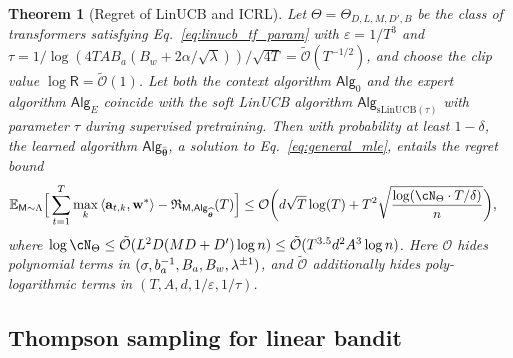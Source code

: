 \documentclass[10pt]{article}
\newtheorem{theorem}{Theorem}
\newcommand{\eps}{\varepsilon}
\renewcommand{\cO}{\mathcal{O}}
\newcommand{\<}{\left\langle}
\renewcommand{\>}{\right\rangle}
\newcommand{\mat}[1]{\ensuremath{\mathbf{#1}}}
\newcommand{\E}{\mathbb{E}}
\newcommand{\B}{\mat{B}}
\newcommand{\inst}{{\mathsf{M}}}
\newcommand{\sLinUCB}{{\mathrm{sLinUCB}}}
\newcommand{\temp}{{\tau}}
\newcommand{\tcO}{{\tilde{\mathcal O}}}
\newcommand{\totlen}{{T}} %
\newcommand{\sAlg}{{\mathsf{Alg}}}
\newcommand{\Numobs}{{n}}   %
\newcommand{\Parspace}{{\Theta}}
\newcommand{\esttfpar}{{\widehat{\btheta}}}
\newcommand{\prior}{{\Lambda}}
\newcommand{\shortexp}{{E}}
\newcommand{\layer}{{L}}
\newcommand{\hidden}{{D'}}
\newcommand{\head}{{M}}
\newcommand{\clipval}{{\mathsf{R}}}
\newcommand{\embd}{{D}}  %
\newcommand{\totreward}{{\mathfrak{R}}}  %
\newcommand{\Numact}{{A}}
\def\btheta{{\boldsymbol \theta}}
\def\ba{{\mathbf a}}
\def\bw{{\mathbf w}}
\newcommand{\authnote}[2]{{\scriptsize $\ll$\textsf{#1 notes: #2}$\gg$}}
\newcommand{\authnote}[2]{}
\newcommand{\lc}[1]{{\color{blue}\authnote{Licong}{#1}}}
\begin{document}
\begin{theorem}[Regret of LinUCB and ICRL]\label{thm:smooth_linucb}
Let $\Theta = \Theta_{D, L, M, \hidden, B}$ be the class of transformers satisfying Eq.~\eqref{eq:linucb_tf_param} with $\eps=1/\totlen^3$ and $\temp = 1/ \log(4\totlen\Numact B_a(B_w+2\alpha/\sqrt{\lambda}))/\sqrt{4\totlen}=\tcO(\totlen^{-1/2})$, and choose the clip value $\log\clipval = \tcO(1)$. Let both the context algorithm $\sAlg_0$ and the expert algorithm $\sAlg_\shortexp$ coincide with the soft LinUCB algorithm $\sAlg_{\sLinUCB(\tau)}$ with parameter $\tau$ during supervised pretraining. Then with probability at least $1-\delta$, the learned algorithm $\sAlg_{\esttfpar}$, a solution to Eq.~\eqref{eq:general_mle}, entails the regret bound
\begin{align*}
\E_{\inst\sim\prior}\Big[\sum_{t=1}^\totlen\max_{k}\<\ba_{t,k},\bw^*\>-\totreward_{\inst,\sAlg_\esttfpar}(\totlen)\Big]&\leq   \cO\bigg( d\sqrt{\totlen}\log(\totlen)+ \totlen^2\sqrt{\frac{\log ( \cN_{\Parspace} \cdot \totlen/\delta )}{n} } \bigg),
\end{align*}
where $\log \cN_{\Parspace} \le \tcO(\layer^2\embd(\head\embd+\hidden) \log\Numobs) \leq \tcO(\totlen^{3.5} d^2 \Numact^3\log\Numobs)$. Here $\cO$ hides polynomial terms in $(\sigma, b_a^{-1}, B_a, \\B_w, \lambda^{\pm1})$, and $\tcO$ additionally hides poly-logarithmic terms in $(\totlen, \Numact, d, 1/\eps,1/\temp)$. 
\end{theorem}



\subsection{Thompson sampling for linear bandit}\label{sec:TS-statement}
\end{document}
